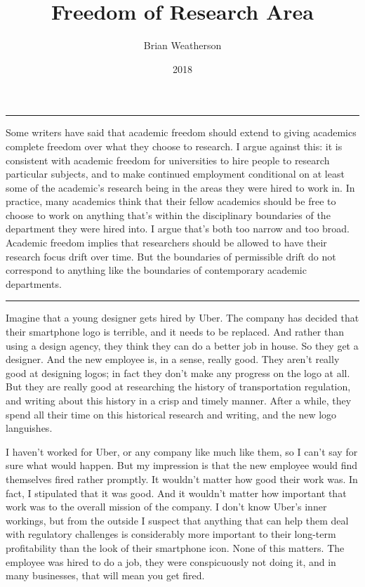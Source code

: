 \documentclass[
  10pt,
  letterpaper,
  DIV=11,
  numbers=noendperiod,
  twoside]{scrartcl}
\title{Freedom of Research Area}
\author{Brian Weatherson}
\date{2018}
\renewenvironment{abstract}
 {\vspace{-1.25cm}
 \quotation\small\noindent\rule{\linewidth}{.5pt}\par\smallskip
 \noindent }
 {\par\noindent\rule{\linewidth}{.5pt}\endquotation}
\begin{document}
\maketitle
\begin{abstract}
Some writers have said that academic freedom should extend to giving
academics complete freedom over what they choose to research. I argue
against this: it is consistent with academic freedom for universities to
hire people to research particular subjects, and to make continued
employment conditional on at least some of the academic's research being
in the areas they were hired to work in. In practice, many academics
think that their fellow academics should be free to choose to work on
anything that's within the disciplinary boundaries of the department
they were hired into. I argue that's both too narrow and too broad.
Academic freedom implies that researchers should be allowed to have
their research focus drift over time. But the boundaries of permissible
drift do not correspond to anything like the boundaries of contemporary
academic departments.
\end{abstract}

Imagine that a young designer gets hired by Uber. The company has
decided that their smartphone logo is terrible, and it needs to be
replaced. And rather than using a design agency, they think they can do
a better job in house. So they get a designer. And the new employee is,
in a sense, really good. They aren't really good at designing logos; in
fact they don't make any progress on the logo at all. But they are
really good at researching the history of transportation regulation, and
writing about this history in a crisp and timely manner. After a while,
they spend all their time on this historical research and writing, and
the new logo languishes.

I haven't worked for Uber, or any company like much like them, so I
can't say for sure what would happen. But my impression is that the new
employee would find themselves fired rather promptly. It wouldn't matter
how good their work was. In fact, I stipulated that it was good. And it
wouldn't matter how important that work was to the overall mission of
the company. I don't know Uber's inner workings, but from the outside I
suspect that anything that can help them deal with regulatory challenges
is considerably more important to their long-term profitability than the
look of their smartphone icon. None of this matters. The employee was
hired to do a job, they were conspicuously not doing it, and in many
businesses, that will mean you get fired.
\end{document}
